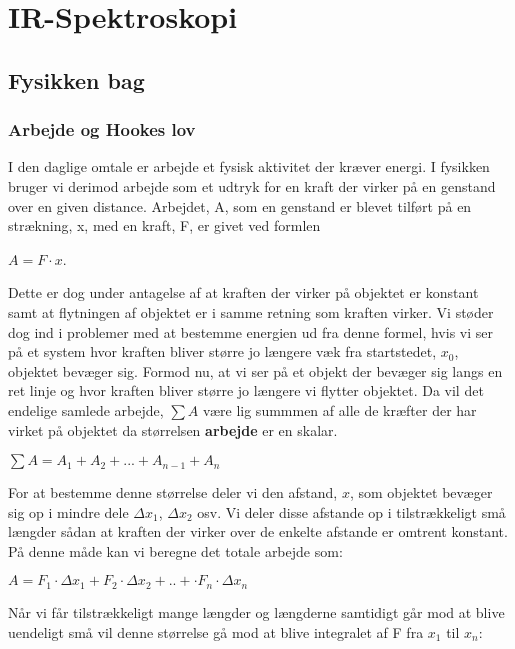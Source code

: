 \chapter{IR-Spektroskopi}

\section{Fysikken bag}
\subsection{Arbejde og Hookes lov}
I den daglige omtale er arbejde et fysisk aktivitet der kræver energi. I fysikken bruger vi derimod arbejde som et udtryk for en kraft der virker på en genstand over en given distance. Arbejdet, A, som en genstand er blevet tilført på en strækning, x, med en kraft, F, er givet ved formlen
\\
\begin{center}
 $A=F \cdot x$. 
\end{center}
\bigskip

Dette er dog under antagelse af at kraften der virker på objektet er konstant samt at flytningen af objektet er i samme retning som kraften virker. 
Vi støder dog ind i problemer med at bestemme energien ud fra denne formel, hvis vi ser på et system hvor kraften bliver større jo længere væk fra startstedet, $x_0$, objektet bevæger sig. Formod nu, at vi ser på et objekt der bevæger sig langs en ret linje og hvor kraften bliver større jo længere vi flytter objektet. Da vil det endelige samlede arbejde, $\sum A$ være lig summmen af alle de kræfter der har virket på objektet da størrelsen \textbf{arbejde} er en skalar.
\\
\begin{center}
$\sum A = A_1 + A_2 + ... + A_{n-1} + A_n$
\end{center}
\bigskip

For at bestemme denne størrelse deler vi den afstand, $x$, som objektet bevæger sig op i mindre dele $\Delta x_1$, $\Delta x_2$ osv. Vi deler disse afstande op i tilstrækkeligt små længder sådan at kraften der virker over de enkelte afstande er omtrent konstant. På denne måde kan vi beregne det totale arbejde som:
\\
\begin{center}
$A = F_1 \cdot \Delta x_1 + F_2 \cdot \Delta x_2 + .. + \cdot F_n \cdot \Delta  x_n$
\end{center}
\bigskip

Når vi får tilstrækkeligt mange længder og længderne samtidigt går mod at blive uendeligt små vil denne størrelse gå mod at blive integralet af F fra $x_1$ til $x_n$: 


